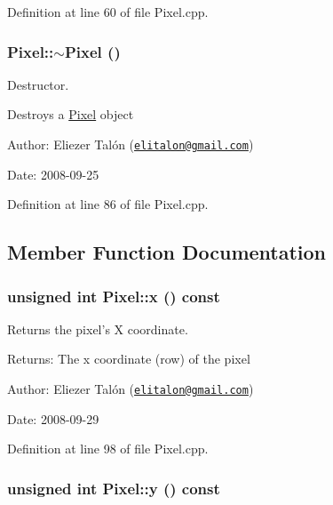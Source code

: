 Definition at line 60 of file Pixel.cpp.\hypertarget{class_pixel_30f6aaf9a1d8792245070860546fa365}{
\subsubsection[$\sim$Pixel]{\setlength{\rightskip}{0pt plus 5cm}Pixel::$\sim$Pixel ()}}
\label{class_pixel_30f6aaf9a1d8792245070860546fa365}


Destructor. 

Destroys a \hyperlink{class_pixel}{Pixel} object

\begin{Desc}
\item[Author:]Eliezer Talón (\href{mailto:elitalon@gmail.com}{\tt elitalon@gmail.com}) \end{Desc}
\begin{Desc}
\item[Date:]2008-09-25 \end{Desc}


Definition at line 86 of file Pixel.cpp.

\subsection{Member Function Documentation}
\hypertarget{class_pixel_68dafccc4588fb33d445641c2766316b}{
\subsubsection[x]{\setlength{\rightskip}{0pt plus 5cm}unsigned int Pixel::x () const}}
\label{class_pixel_68dafccc4588fb33d445641c2766316b}


Returns the pixel's X coordinate. 

\begin{Desc}
\item[Returns:]The x coordinate (row) of the pixel\end{Desc}
\begin{Desc}
\item[Author:]Eliezer Talón (\href{mailto:elitalon@gmail.com}{\tt elitalon@gmail.com}) \end{Desc}
\begin{Desc}
\item[Date:]2008-09-29 \end{Desc}


Definition at line 98 of file Pixel.cpp.\hypertarget{class_pixel_204cc91a99e1e4f1d96c9cf6caf5747a}{
\subsubsection[y]{\setlength{\rightskip}{0pt plus 5cm}unsigned int Pixel::y () const}}
\label{class_pixel_204cc91a99e1e4f1d96c9cf6caf5747a}


